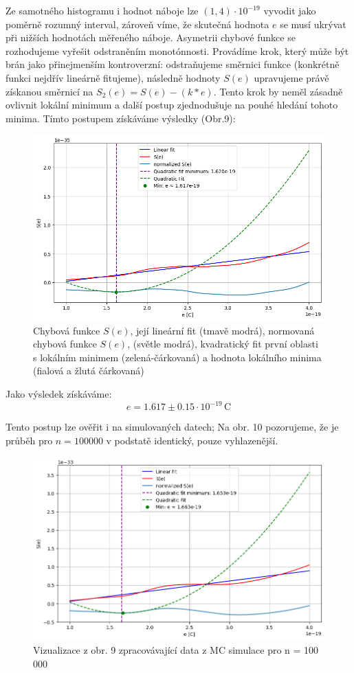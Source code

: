 \documentclass[czech,11pt,a4paper]{article}
\begin{document}
\begin{multicols}{2}
\begin{figure}[H]
		\end{figure}	 
		Ze samotného histogramu i hodnot náboje lze $(1,4)\cdot 10^{-19}$ vyvodit jako poměrně rozumný interval, zároveň víme, že skutečná hodnota $e$ se musí ukrývat při nižších hodnotách měřeného náboje. Asymetrii chybové funkce se rozhodujeme vyřešit odstraněním monotónnosti. Provádíme krok, který může být brán jako přinejmenším kontroverzní: odstraňujeme směrnici funkce (konkrétně funkci nejdřív lineárně fitujeme), následně hodnoty $S(e)$ upravujeme právě získanou směrnicí na $S_2(e) = S(e) - (k*e)$. Tento krok by neměl zásadně ovlivnit lokální minimum a další postup zjednodušuje na pouhé hledání tohoto minima. Tímto postupem získáváme výsledky (Obr.9):
		
		\begin{figure}[H]
			\centering
			\includegraphics[width=0.8\linewidth]{fit4}
			\caption{Chybová funkce $S(e)$, její lineární fit (tmavě modrá), normovaná chybová funkce $S(e)$, (světle modrá), kvadratický fit první oblasti s lokálním minimem (zelená-čárkovaná) a hodnota lokálního minima (fialová a žlutá čárkovaná)}
			
		\end{figure}	 
			 
			 Jako výsledek získáváme:
			 \begin{equation*}
			 	e = 1.617 \pm 0.15 \cdot 10^{-19} \,\mathrm{C} 
			 \end{equation*}
			 
	 	Tento postup lze ověřit i na simulovaných datech; Na obr. 10 pozorujeme, že je průběh pro $n = 100 000$ v podstatě identický, pouze vyhlazenější.
	 	
	 	\begin{figure}[H]
	 		\centering
	 		\includegraphics[width=0.8\linewidth]{fit5}
	 		\caption{Vizualizace z obr. 9 zpracovávající data z MC simulace pro n = 100 000}
	 		

\end{figure}
\end{multicols}
\end{document}
